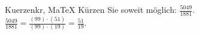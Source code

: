 \begin{MAufgabe}{Kuerzen}{kr, MaTeX}
K\"urzen Sie soweit m\"oglich: $\frac{5049}{1881}$.\\ 
\ifLsg\MLoesung
\quad $\frac{5049}{1881}=\frac{(99)\cdot(51)}{(99)\cdot(19)}=\frac{51}{19}$.\else\relax\fi
 \end{MAufgabe}